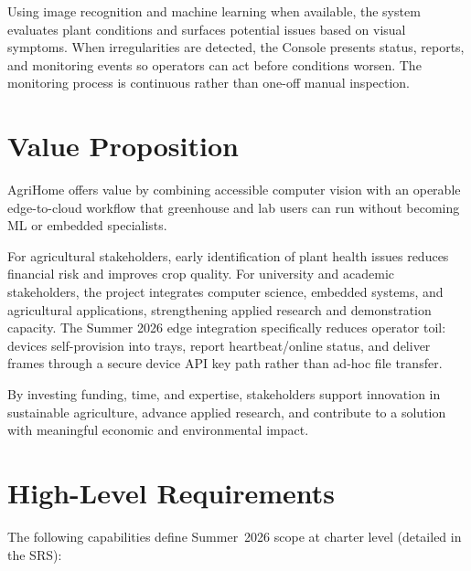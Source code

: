 \documentclass[11pt,letterpaper]{article}
\begin{document}
Using image recognition and machine learning when available, the system evaluates plant conditions
and surfaces potential issues based on visual symptoms. When irregularities are detected, the Console
presents status, reports, and monitoring events so operators can act before conditions worsen. The
monitoring process is continuous rather than one-off manual inspection.

\section{Value Proposition}
AgriHome offers value by combining accessible computer vision with an operable edge-to-cloud
workflow that greenhouse and lab users can run without becoming ML or embedded specialists.

For agricultural stakeholders, early identification of plant health issues reduces financial risk and
improves crop quality. For university and academic stakeholders, the project integrates computer
science, embedded systems, and agricultural applications, strengthening applied research and
demonstration capacity. The Summer 2026 edge integration specifically reduces operator toil:
devices self-provision into trays, report heartbeat/online status, and deliver frames through a secure
device API key path rather than ad-hoc file transfer.

By investing funding, time, and expertise, stakeholders support innovation in sustainable agriculture,
advance applied research, and contribute to a solution with meaningful economic and environmental
impact.

\section{High-Level Requirements}
The following capabilities define Summer~2026 scope at charter level (detailed in the SRS):
\end{document}
